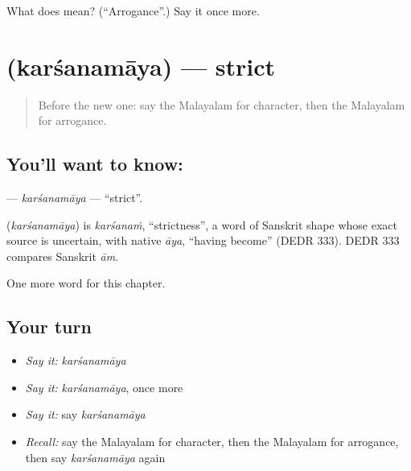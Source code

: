 \begin{tcolorbox}[breakable,colback=teal!4,colframe=teal!35!black,title={Before you move on}]
What does  mean? (\textquotedblleft{}Arrogance\textquotedblright{}.) Say it once more.
\end{tcolorbox}
\section[\texorpdfstring{\ml{കർശനമായ} (karśanamāya)}{കർശനമായ (karśanamāya)}]{ (karśanamāya) — strict}

\label{lesson:ML-C319-karsanamaya}



\begin{quote}
Before the new one: say the Malayalam for character, then the Malayalam for arrogance.
\end{quote}

\subsection*{You'll want to know: }
\textbf{} — \emph{karśanamāya} — \textquotedblleft{}strict\textquotedblright{}.

\begin{cousinweb}
\textbf{} (\emph{karśanamāya}) is \emph{karśanaṁ}, \textquotedblleft{}strictness\textquotedblright{}, a word of Sanskrit shape whose exact source is uncertain, with native \emph{āya}, \textquotedblleft{}having become\textquotedblright{} (DEDR 333). DEDR 333 compares Sanskrit \emph{ām}.
\end{cousinweb}

\begin{grammarlens}[title={What you've built}]
One more word for this chapter.
\end{grammarlens}

\subsection*{Your turn}
\begin{itemize}
\raggedright
  \item \emph{Say it:} \emph{karśanamāya}
  \item \emph{Say it:} \emph{karśanamāya}, once more
  \item \emph{Say it:} say \emph{karśanamāya}
  \item \emph{Recall:} say the Malayalam for character, then the Malayalam for arrogance, then say \emph{karśanamāya} again
\end{itemize}

